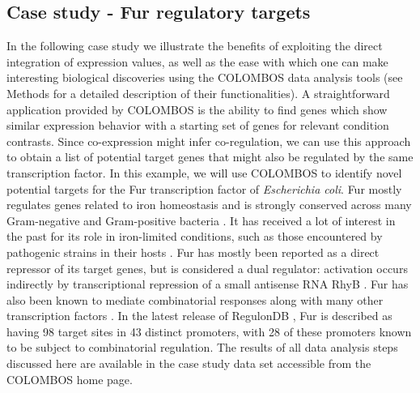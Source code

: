 \subsection{Case study - Fur regulatory targets}
In the following case study we illustrate the benefits of exploiting the direct  integration of expression values, as well as the ease with which one can make  interesting biological discoveries using the COLOMBOS data analysis tools (see  Methods for a detailed description of their functionalities). A straightforward  application provided by COLOMBOS is the ability to find genes which show  similar expression behavior with a starting set of genes for relevant condition  contrasts. Since co-expression might infer co-regulation, we can use this  approach to obtain a list of potential target genes that might also be  regulated by the same transcription factor. In this example, we will use  COLOMBOS to identify novel potential targets for the Fur transcription factor  of {\it Escherichia coli}. Fur mostly regulates genes related to iron  homeostasis and is strongly conserved across many Gram-negative and  Gram-positive bacteria \cite{Chen2007}. It has received a lot of interest in  the past for its role in iron-limited conditions, such as those encountered by  pathogenic strains in their hosts \cite{Panina2001}. Fur has mostly been  reported as a direct repressor of its target genes, but is considered a dual  regulator: activation occurs indirectly by transcriptional repression of a  small antisense RNA RhyB \cite{Masse2002}. Fur has also been known to mediate  combinatorial responses along with many other transcription factors  \cite{Patzer2001, Zhang2005}. In the latest release of RegulonDB  \cite{Gama-Castro2008}, Fur is described as having 98 target sites in 43  distinct promoters, with 28 of these promoters known to be subject to  combinatorial regulation. The results of all data analysis steps discussed here  are available in the case study data set accessible from the COLOMBOS home page.

